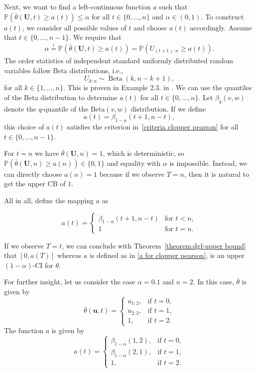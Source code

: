Next, we want to find a left-continuous function $a$ such that $\mathbb{P} \left( \bar \theta (\mathbf U, t) \geq a(t) \right) \leq \alpha$ for all $t\in \{0, \ldots , n\}$ and $\alpha \in (0, 1)$.
To construct $a(t)$, we consider all possible values of $t$ and choose $a(t)$ accordingly. Assume that $t\in\{0,\ldots,n-1\}$. We require that
\begin{align}
	\alpha
	\overset{!}{=}
	\mathbb{P}\left(
	\bar{\theta}(\mathbf{U},t) \geq a(t)
	\right) 
	=
	\mathbb{P}\left(
	U_{(t+1):n} \geq a(t)
	\right).
	\label{criteria clopper pearson}
\end{align}
The order statistics of independent standard uniformly distributed random variables follow Beta distributions, i.e.,
\[
U_{k:n}\sim\operatorname{Beta}(k,n-k+1),
\]
for all $k \in \{1, \ldots, n\}$. This is proven in Example 2.3. in \cite{david2004order}.
We can use the quantiles of the Beta distribution to determine $a(t)$ for all $t \in \{0, \ldots, n\}$.
Let $\beta_q (v, w)$ denote the $q$-quantile of the $\text{Beta}(v, w)$ distribution. 
If we define
\[
a(t)=\beta_{1-\alpha}(t+1,n-t),
\]
this choice of $a(t)$ satisfies the criterion in~\eqref{criteria clopper pearson} for all $t \in \{0, \ldots , n-1\}$.

For $t = n$ we have $\bar\theta(\mathbf U, n) = 1$, which is deterministic, so
$\mathbb P(\bar\theta(\mathbf U,n) \geq a(n)) \in \{0,1\}$ and equality with $\alpha$ is impossible.
Instead, we can directly choose $a(n)= 1$ because if we observe $T = n$, then it is natural to get the upper CB of $1$.

All in all, define the mapping $a$ as

\begin{equation} \label{a for clopper pearson}
	a(t) = 
	\begin{cases}
		\beta_{1- \alpha}(t+1, n-t) &\text{for } t < n, \\
		1 &\text{for } t = n.
	\end{cases}
\end{equation}

If we observe $T = t$, we can conclude with Theorem~\ref{theorem:dgf-upper bound} that $[0, a(T)]$ whereas $a$ is defined as in \eqref{a for clopper pearson}, is an upper $(1-\alpha)$-CI for $\theta$.

For further insight, let us consider the case $\alpha = 0.1$ and \(n=2\). In this case, \(\bar{\theta}\) is given by
\[
\bar \theta(\mathbf{u},t)
=
\begin{cases}
	u_{1:2}, & \text{if } t=0,\\
	u_{2:2}, & \text{if } t=1,\\
	1, & \text{if } t=2.
\end{cases}
\]
The function \(a\) is given by
\[
a(t)
=
\begin{cases}
	\beta_{1-\alpha}(1,2), & \text{if } t=0,\\
	\beta_{1-\alpha}(2,1), & \text{if } t=1,\\
	1, & \text{if } t=2.
\end{cases}
\]


